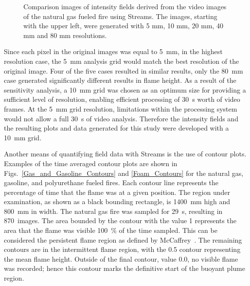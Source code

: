 \documentclass[twoside]{uocthesis}
\begin{document}
{{\begin{figure}[p]
	 \caption[Comparison images of intensity fields derived from the video images of the natural gas fueled fire]{Comparison images of intensity fields derived from the video images of the natural gas fueled fire using Streams. The images, starting with the upper left, were generated with 5 mm, 10 mm, 20 mm, 40 mm and 80 mm resolutions.}
	 \label{Intensity}
\end{figure}


Since each pixel in the original images was equal to 5~mm, in the highest resolution case, the 5~mm analysis grid would match the best resolution of the original image.  Four of the five cases resulted in similar results, only the 80~mm case generated significantly different results in flame height.  As a result of the sensitivity analysis, a 10~mm grid was chosen as an optimum size for providing a sufficient level of resolution, enabling efficient processing of 30~s worth of video frames.  At the 5~mm grid resolution, limitations within the processing system would not allow a full 30~s of video analysis.  Therefore the intensity fields and the resulting plots and data generated for this study were developed with a 10~mm grid.

Another means of quantifying field data with Streams is the use of contour plots.  Examples of the time averaged contour plots are shown in Figs.~\ref{Gas_and_Gasoline_Contours} and \ref{Foam_Contours} for the natural gas, gasoline, and polyurethane fueled fires.  Each contour line represents the percentage of time that the flame was at a given position. The region under examination, as shown as a black bounding rectangle, is 1400~mm high and 800~mm in width.  The natural gas fire was sampled for 29~s, resulting in 870~images. The area bounded by the contour with the value 1 represents the area that the flame was visible 100~\% of the time sampled. This can be considered the persistent flame region as defined by McCaffrey~\cite{McCaffrey:1979}. The remaining contours are in the intermittent flame region, with the 0.5 contour representing the mean flame height. Outside of the final contour, value 0.0, no visible flame was recorded; hence this contour marks the definitive start of the buoyant plume region.

}}
\end{document}
